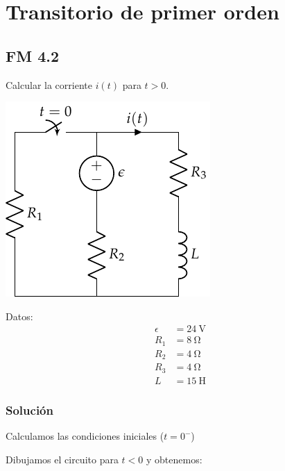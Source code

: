\documentclass[12pt]{article}
\begin{document}
\title{}

\section{Transitorio de primer orden}

\subsection{FM 4.2}

Calcular la corriente $i(t)$ para $t > 0$. 

\begin{minipage}{0.5\textwidth}
\includegraphics{figs/FM_4_2}
\end{minipage}
\hfill
\begin{minipage}{0.5\textwidth}
Datos:
\begin{align*}
  \epsilon &= \SI{24}{\volt}\\
  R_1 &= \SI{8}{\ohm}\\
  R_2 &= \SI{4}{\ohm}\\
  R_3 &= \SI{4}{\ohm}\\
  L &= \SI{15}{\henry}
\end{align*}
\end{minipage}

\subsubsection*{Solución}

Calculamos las condiciones iniciales ($t = 0^-$)

Dibujamos el circuito para $t < 0$ y obtenemos:
\end{document}
